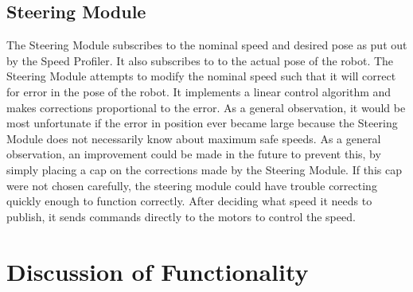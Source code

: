 \documentclass{article}
\begin{document}
\subsection{Steering Module}

The Steering Module subscribes to the nominal speed and desired pose as put out by the Speed Profiler.  It also subscribes to to the actual pose of the robot.  The Steering Module attempts to modify the nominal speed such that it will correct for error in the pose of the robot.  It implements a linear control algorithm and makes corrections proportional to the error.  As a general observation, it would be most unfortunate if the error in position ever became large because the Steering Module does not necessarily know about maximum safe speeds.  As a general observation, an improvement could be made in the future to prevent this, by simply placing a cap on the corrections made by the Steering Module.  If this cap were not chosen carefully, the steering module could have trouble correcting quickly enough to function correctly.  After deciding what speed it needs to publish, it sends commands directly to the motors to control the speed.

\section{Discussion of Functionality}
\end{document}
